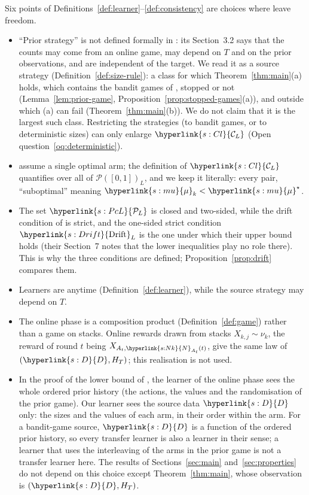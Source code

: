 \documentclass[11pt]{article}
\newcommand{\sy}[2]{\hyperlink{#1}{#2}}
\newcommand{\PcL}[1][L]{\sy{s:PcL}{\mathcal{P}_{#1}}}
\newcommand{\ClL}[1][L]{\sy{s:Cl}{\mathcal{C}_{#1}}}
\newcommand{\Drift}{\sy{s:Drift}{\mathrm{Drift}}}
\newcommand{\Dd}{\sy{s:D}{D}}
\newcommand{\Nc}{\sy{s:Nk}{N}}
\newcommand{\mean}{\sy{s:mu}{\mu}}
\begin{document}
Six points of Definitions~\ref{def:learner}--\ref{def:consistency} are choices where
\citet{PMRM26} leave freedom.
\begin{itemize}
\item ``Prior strategy'' is not defined formally in \citet{PMRM26}: its Section~3.2 says that the
  counts may come from an online game, may depend on $T$ and on the prior observations, and are
  independent of the target. We read it as a source strategy (Definition~\ref{def:size-rule}): a
  class for which Theorem~\ref{thm:main}(a) holds, which contains the bandit games of
  \citet[Theorem~2]{PMRM26}, stopped or not (Lemma~\ref{lem:prior-game},
  Proposition~\ref{prop:stopped-games}(a)), and outside which (a) can fail
  (Theorem~\ref{thm:main}(b)). We do not claim that it is the largest such class. Restricting the
  strategies (to bandit games, or to deterministic sizes) can only enlarge $\ClL$ (Open
  question~\ref{oq:deterministic}).
\item \citet[Section~3.1]{PMRM26} assume a single optimal arm; the definition of $\ClL$ quantifies
  over all of $\mathcal P([0,1])_L$, and we keep it literally: every pair, ``suboptimal'' meaning
  $\mean_k<\mean^\star$.
\item The set $\PcL$ is closed and two-sided, while the drift condition of
  \citet[Section~3.2]{PMRM26} is strict, and the one-sided strict condition $\Drift_L$ is the one
  under which their upper bound holds (their Section~7 notes that the lower inequalities play no
  role there). This is why the three conditions are defined; Proposition~\ref{prop:drift} compares
  them.
\item Learners are anytime (Definition~\ref{def:learner}), while the source strategy may depend on
  $T$.
\item The online phase is a composition product (Definition~\ref{def:game}) rather than a game on
  stacks. Online rewards drawn from stacks $X_{k,j}\sim\nu_k$, the reward of round $t$ being
  $X_{A_t,\Nc_{A_t}(t)}$, give the same law of $(\Dd,H_T)$; this realisation is not used.
\item In the proof of the lower bound of \citet[Appendix~E]{PMRM26}, the learner of the online
  phase sees the whole ordered prior history (the actions, the values and the randomisation of the
  prior game). Our learner sees the source data $\Dd$ only: the sizes and the values of each arm, in
  their order within the arm. For a bandit-game source, $\Dd$ is a function of the ordered prior
  history, so every transfer learner is also a learner in their sense; a learner that uses the
  interleaving of the arms in the prior game is not a transfer learner here. The results of
  Sections~\ref{sec:main} and~\ref{sec:properties} do not depend on this choice except
  Theorem~\ref{thm:main}, whose observation is $(\Dd,H_T)$.
\end{itemize}
\end{document}
